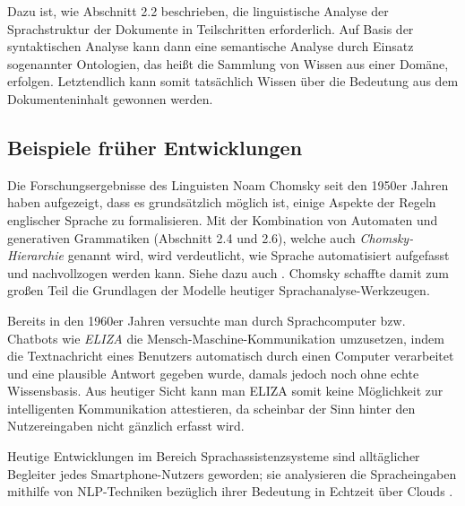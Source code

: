 \documentclass[12pt]{report}
\begin{document}
Dazu ist, wie Abschnitt 2.2 beschrieben, die linguistische Analyse der Sprachstruktur der Dokumente in Teilschritten erforderlich. Auf Basis der syntaktischen Analyse kann dann eine semantische Analyse durch Einsatz sogenannter Ontologien, das heißt die Sammlung von Wissen aus einer Domäne, erfolgen. Letztendlich kann somit tatsächlich Wissen über die Bedeutung aus dem Dokumenteninhalt gewonnen werden.

\subsection{Beispiele früher Entwicklungen}
Die Forschungsergebnisse des Linguisten Noam Chomsky seit den 1950er Jahren haben aufgezeigt, dass es grundsätzlich möglich ist, einige Aspekte der Regeln englischer Sprache zu formalisieren. Mit der Kombination von Automaten und generativen Grammatiken (Abschnitt 2.4 und 2.6), welche auch \textit{Chomsky-Hierarchie} genannt wird, wird verdeutlicht, wie Sprache automatisiert aufgefasst und nachvollzogen werden kann. Siehe dazu auch \cite{cho57}. Chomsky schaffte damit zum großen Teil die Grundlagen der Modelle heutiger Sprachanalyse-Werkzeugen.

Bereits in den 1960er Jahren versuchte man durch Sprachcomputer bzw. Chatbots wie \textit{ELIZA} \cite{wei66} die Mensch-Maschine-Kommunikation umzusetzen, indem die Textnachricht eines Benutzers automatisch durch einen Computer verarbeitet und eine plausible Antwort gegeben wurde, damals jedoch noch ohne echte Wissensbasis. Aus heutiger Sicht kann man ELIZA somit keine Möglichkeit zur \glqq   intelligenten\grqq{} Kommunikation attestieren, da scheinbar der Sinn hinter den Nutzereingaben nicht gänzlich erfasst wird.

Heutige Entwicklungen im Bereich Sprachassistenzsysteme sind alltäglicher Begleiter jedes Smartphone-Nutzers geworden; sie analysieren die Spracheingaben mithilfe von NLP-Techniken bezüglich ihrer Bedeutung in Echtzeit über Clouds \cite{hao14}.
\end{document}
